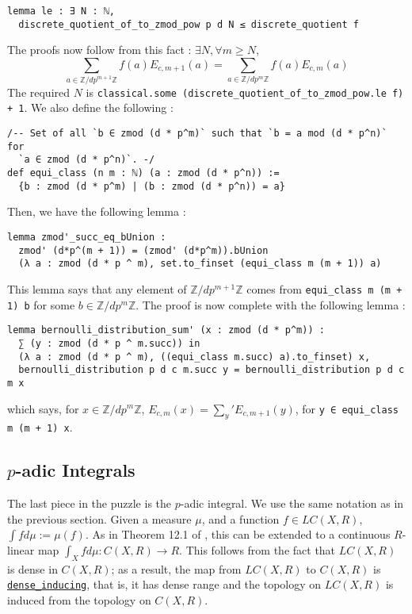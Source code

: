 \documentclass[a4paper,UKenglish,cleveref, autoref, thm-restate]{lipics-v2021}
\newcommand{\lean}[1]{\texttt{#1}\xspace} %
\begin{document}
\begin{lstlisting}
lemma le : ∃ N : ℕ, 
  discrete_quotient_of_to_zmod_pow p d N ≤ discrete_quotient f
\end{lstlisting} 
The proofs now follow from this fact : $\exists N, \forall m \ge N$,
$$ \sum_{a \in \mathbb{Z}/dp^{m + 1} \mathbb{Z}} f(a) E_{c,m + 1}(a) = \sum_{a \in \mathbb{Z}/dp^{m} \mathbb{Z}} f(a) E_{c,m}(a) $$
The required $N$ is \lean{classical.some (discrete\_quotient\_of\_to\_zmod\_pow.le f) + 1}. We also define the following : 
\begin{lstlisting}
/-- Set of all `b ∈ zmod (d * p^m)` such that `b = a mod (d * p^n)` for 
  `a ∈ zmod (d * p^n)`. -/
def equi_class (n m : ℕ) (a : zmod (d * p^n)) := 
  {b : zmod (d * p^m) | (b : zmod (d * p^n)) = a}
\end{lstlisting}
Then, we have the following lemma :
\begin{lstlisting}
lemma zmod'_succ_eq_bUnion : 
  zmod' (d*p^(m + 1)) = (zmod' (d*p^m)).bUnion
  (λ a : zmod (d * p ^ m), set.to_finset (equi_class m (m + 1)) a) 
\end{lstlisting}
This lemma says that any element of $\mathbb{Z}/dp^{m + 1} \mathbb{Z}$ comes from \lean{equi\_class m (m + 1) b} for some $b \in \mathbb{Z}/dp^m \mathbb{Z}$. 
The proof is now complete with the following lemma :
\begin{lstlisting}
lemma bernoulli_distribution_sum' (x : zmod (d * p^m)) : 
  ∑ (y : zmod (d * p ^ m.succ)) in 
  (λ a : zmod (d * p ^ m), ((equi_class m.succ) a).to_finset) x,
  bernoulli_distribution p d c m.succ y = bernoulli_distribution p d c m x 
\end{lstlisting}
which says, for $x \in \mathbb{Z}/dp^m \mathbb{Z}$, $E_{c, m} (x) = \sum_{y}' E_{c, m + 1} (y)$, for \lean{y ∈ equi\_class m (m + 1) x}. 

\subsection{$p$-adic Integrals}
The last piece in the puzzle is the $p$-adic integral. We use the same notation as in the previous
section. Given a measure $\mu$, and a function $f \in LC(X, R)$, $\int f d\mu := \mu(f)$. As in Theorem 12.1 of \cite{cyc}, this can be extended to a
continuous $R$-linear map $ \int_X f d\mu : C(X, R) \xrightarrow[]{} R $. 
This follows from the fact that $LC(X, R)$ is dense in $C(X, R)$; as a result, the map from 
$LC(X, R)$ to $C(X, R)$ is \href{https://leanprover-community.github.io/mathlib_docs/topology/dense_embedding.html#dense_inducing}{\lean{dense\_inducing}}, 
that is, it has dense range and the topology on $LC(X, R)$ is 
induced from the topology on $C(X,R)$. 
\end{document}
